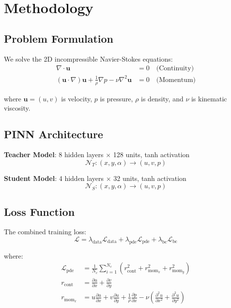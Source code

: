 \documentclass[11pt,letterpaper]{article}
\begin{document}
\section{Methodology}

\subsection{Problem Formulation}

We solve the 2D incompressible Navier-Stokes equations:
\begin{align}
    \nabla \cdot \mathbf{u} &= 0 \quad \text{(Continuity)} \\
    (\mathbf{u} \cdot \nabla)\mathbf{u} + \frac{1}{\rho}\nabla p - \nu \nabla^2 \mathbf{u} &= 0 \quad \text{(Momentum)}
\end{align}

where $\mathbf{u} = (u, v)$ is velocity, $p$ is pressure, $\rho$ is density, and $\nu$ is kinematic viscosity.

\subsection{PINN Architecture}

\textbf{Teacher Model}: 8 hidden layers $\times$ 128 units, tanh activation
\begin{equation}
    \mathcal{N}_T: (x, y, \alpha) \rightarrow (u, v, p)
\end{equation}

\textbf{Student Model}: 4 hidden layers $\times$ 32 units, tanh activation
\begin{equation}
    \mathcal{N}_S: (x, y, \alpha) \rightarrow (u, v, p)
\end{equation}

\subsection{Loss Function}

The combined training loss:
\begin{equation}
    \mathcal{L} = \lambda_{\text{data}} \mathcal{L}_{\text{data}} + \lambda_{\text{pde}} \mathcal{L}_{\text{pde}} + \lambda_{\text{bc}} \mathcal{L}_{\text{bc}}
\end{equation}

where:
\begin{align}
    \mathcal{L}_{\text{pde}} &= \frac{1}{N_c} \sum_{i=1}^{N_c} \left( r_{\text{cont}}^2 + r_{\text{mom}_x}^2 + r_{\text{mom}_y}^2 \right) \\
    r_{\text{cont}} &= \frac{\partial u}{\partial x} + \frac{\partial v}{\partial y} \\
    r_{\text{mom}_x} &= u\frac{\partial u}{\partial x} + v\frac{\partial u}{\partial y} + \frac{1}{\rho}\frac{\partial p}{\partial x} - \nu\left(\frac{\partial^2 u}{\partial x^2} + \frac{\partial^2 u}{\partial y^2}\right)
\end{align}
\end{document}

